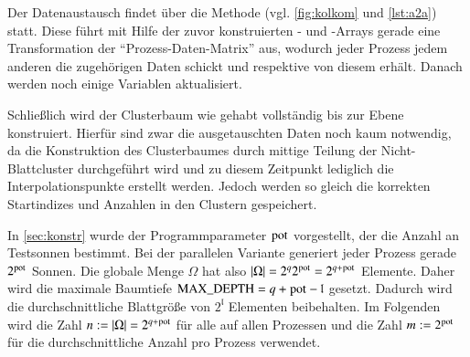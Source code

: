     Der Datenaustausch findet über die Methode  (vgl. \autoref{fig:kolkom} und \autoref{lst:a2a}) statt. Diese führt mit Hilfe der zuvor konstruierten - und 
    -Arrays gerade eine Transformation der ``Prozess-Daten-Matrix'' aus, wodurch jeder Prozess jedem anderen die zugehörigen Daten schickt und respektive von diesem erhält.
    Danach werden noch einige Variablen aktualisiert. 
    
    Schließlich wird der Clusterbaum wie gehabt vollständig bis zur Ebene  konstruiert. Hierfür sind zwar die ausgetauschten Daten noch kaum notwendig, da die Konstruktion des 
    Clusterbaumes durch mittige Teilung der Nicht-Blattcluster durchgeführt wird und zu diesem Zeitpunkt lediglich die Interpolationspunkte erstellt werden. Jedoch werden so gleich die korrekten
    Startindizes und Anzahlen in den Clustern gespeichert.
    
    In \autoref{sec:konstr} wurde der Programmparameter $\tcode{pot}$ vorgestellt, der die Anzahl an Testsonnen bestimmt. Bei der parallelen Variante generiert jeder Prozess gerade $2^{\tcode{pot}}$
    Sonnen. Die globale Menge $\Omega$ hat also $|\Omega| = 2^q 2^\tcode{pot} = 2^{q+\tcode{pot}}$ Elemente. Daher wird die maximale Baumtiefe $\tcode{MAX_DEPTH} = q + \tcode{pot} - \mathfrak{l}$ 
    gesetzt. Dadurch wird die durchschnittliche Blattgröße von $2^\mathfrak{l}$ Elementen beibehalten. Im Folgenden wird die Zahl $n := |\Omega| = 2^{q+\tcode{pot}}$ für alle  auf allen 
    Prozessen und die Zahl $m := 2^\tcode{pot}$ für die durchschnittliche Anzahl  pro Prozess verwendet.
    
